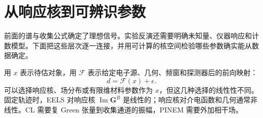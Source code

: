 \section{从响应核到可辨识参数}
\label{chap:feqo-end-to-end}

前面的谱与收集公式确定了理想信号。实验反演还需要明确未知量、仪器响应和计数模型。下面把这些层次逐一连接，并用可计算的核空间检验哪些参数确实能从数据确定。

\begin{definition}[前向模型与参数层次]
用 $x$ 表示待估对象，用 $\mathcal F$ 表示给定电子源、几何、频窗和探测器后的前向映射：
\begin{equation}
d=\mathcal F(x)+\epsilon.
\label{eq:feqo-forward-operator}
\end{equation}
可以选择响应核、场分布或有限维材料参数作为 $x$，但这几种选择的线性性不同。固定轨迹时，EELS 对响应核 $\operatorname{Im}\mathbf G^R$ 是线性的；响应核对介电函数和几何通常非线性。CL 需要复 Green 张量到收集通道的振幅，PINEM 需要外加相干场。
\end{definition}

